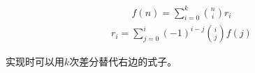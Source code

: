 $$ \begin{aligned} f(n)=\sum_{i=0}^{k}{n\choose i}r_i \end{aligned} $$
$$ \begin{aligned} r_i=\sum_{j=0}^i(-1)^{i-j}{i\choose j}f(j) \end{aligned} $$

实现时可以用$k$次差分替代右边的式子。